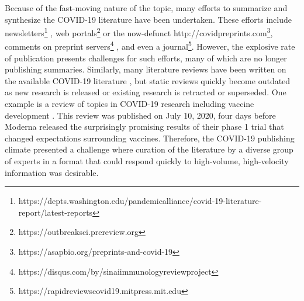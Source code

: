 \documentclass[twocolumn]{ceurart}
\begin{document}
Because of the fast-moving nature of the topic, many efforts to summarize and synthesize the COVID-19 literature have been undertaken.
These efforts include newsletters\footnote{https://depts.washington.edu/pandemicalliance/covid-19-literature-report/latest-reports} \citep{JdWiPJCL}, web portals\footnote{https://outbreaksci.prereview.org} \citep{1CBWvhTdy} or the now-defunct http://covidpreprints.com\footnote{https://asapbio.org/preprints-and-covid-19}, comments on preprint servers\footnote{https://disqus.com/by/sinaiimmunologyreviewproject} \citep{YZ4cHNuH}, and even a journal\footnote{https://rapidreviewscovid19.mitpress.mit.edu}.
However, the explosive rate of publication presents challenges for such efforts, many of which are no longer publishing summaries.
Similarly, many literature reviews have been written on the available COVID-19 literature \citep{I2EsJmfs, 5x25saIz, evtsR3C5, 18eCxyLhx, SAE5ME3N, xOs5ctsW}, but static reviews quickly become outdated as new research is released or existing research is retracted or superseded.
One example is a review of topics in COVID-19 research including vaccine development \citep{xOs5ctsW}.
This review was published on July 10, 2020, four days before Moderna released the surprisingly promising results of their phase 1 trial \citep{wiGjCZC8} that changed expectations surrounding vaccines.
Therefore, the COVID-19 publishing climate presented a challenge where curation of the literature by a diverse group of experts in a format that could respond quickly to high-volume, high-velocity information was desirable.
\end{document}
